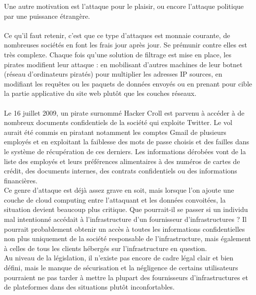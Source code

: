 \documentclass[a4paper,12pt]{report}
\begin{document}
\begin{onehalfspace}
Une autre motivation est l'attaque pour le plaisir, ou encore l'attaque politique par une puissance étrangère.

	\paragraph*{} 
	Ce qu'il faut retenir, c'est que ce type d'attaques est monnaie courante, de nombreuses sociétés en font les frais jour après jour. Se prémunir contre elles est très complexe. Chaque fois qu'une solution de filtrage est mise en place, les pirates modifient leur attaque : en mobilisant d'autres machines de leur botnet (réseau d'ordinateurs piratés) pour multiplier les adresses IP sources, en modifiant les requêtes ou les paquets de données envoyés ou en prenant pour cible la partie applicative du site web plutôt que les couches réseaux.
	
	\paragraph*{}
	Le 16 juillet 2009, un pirate surnommé Hacker Croll est parvenu à accéder à de nombreux documents confidentiels de la société qui exploite Twitter. Le vol aurait été commis en piratant notamment les comptes Gmail de plusieurs employés et en exploitant la faiblesse des mots de passe choisis
et des failles dans le système de récupération de ces derniers. Les informations dérobées vont de la liste des employés et leurs préférences alimentaires à des numéros de cartes de crédit, des documents internes, des contrats confidentiels ou des informations financières. \\
Ce genre d'attaque est déjà assez grave en soit, mais lorsque l'on ajoute une couche de cloud computing entre l'attaquant et les données convoitées, la situation devient beaucoup plus critique. Que pourrait-il se passer si un individu mal intentionné accédait à l'infrastructure d'un fournisseur d'infrastructures ? Il pourrait probablement obtenir un accès à toutes les informations confidentielles non plus uniquement de la société responsable de l'infrastructure, mais également à celles de tous les clients hébergés sur l'infrastructure en question.\\
Au niveau de la législation, il n'existe pas encore de cadre légal clair et bien défini, mais le manque de sécurisation et la négligence de certains utilisateurs pourraient ne pas
tarder à mettre la plupart des fournisseurs d'infrastructures et de plateformes dans des
situations plutôt inconfortables.


\end{onehalfspace}
\end{document}

